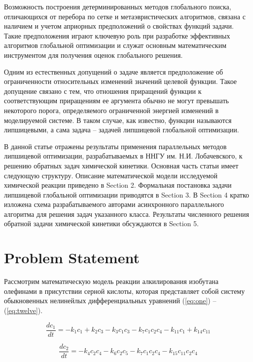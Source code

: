 \documentclass{svproc}
\begin{document}
Возможность построения детерминированных методов глобального поиска, отличающихся от перебора по сетке и метаэвристических алгоритмов, связана с наличием и учетом  априорных предположений о свойствах функций задачи. Такие предположения играют ключевую роль при разработке эффективных алгоритмов глобальной оптимизации и служат основным математическим инструментом для получения оценок глобального решения.

Одним из естественных допущений о задаче является предположение об ограниченности относительных изменений значений целевой функции. Такое допущение связано с тем, что отношения приращений функции к соответствующим приращениям ее аргумента обычно не могут превышать некоторого порога, определяемого ограниченной энергией изменений в моделируемой системе. В таком случае, как известно, функции называются липшицевыми, а сама задача -- задачей липшицевой глобальной оптимизации. 

В данной статье отражены результаты применения параллельных методов липшицевой оптимизации, разрабатываемых в ННГУ им. Н.И. Лобачевского, к решению обратных задач химической кинетики. 
Основная часть статьи имеет следующую структуру. Описание математической модели исследуемой химической реакции приведено в Section 2. Формальная постановка задачи липшицевой глобальной оптимизации приводятся в Section 3. В Section 4 кратко изложена схема разрабатываемого авторами асинхронного параллельного алгоритма для решения задач указанного класса. Результаты численного решения обратной задачи химической кинетики обсуждаются в Section 5.


\section{Problem Statement}\label{Sec_math_mod}

Рассмотрим математическую модель реакции алкилирования изобутана олефинами в присутствии серной кислоты, которая представляет собой систему обыкновенных нелинейлых дифференциальных уравнений (\ref{eq:one}) -- (\ref{eq:twelve}).

\begin{equation}
  \frac{dc_1}{dt} = -k_1c_1 + k_2c_3 - k_3c_1c_3 - k_7c_1c_2c_4 - k_{11}c_1 + k_{14}c_{11}
  \label{eq:one}
\end{equation}

\begin{equation}
  \frac{dc_2}{dt} = -k_4c_2c_4 - k_6c_2c_5 - k_7c_1c_2c_4 - k_{15}c_{11}c_2c_4
  \label{eq:two}
\end{equation}
\end{document}
